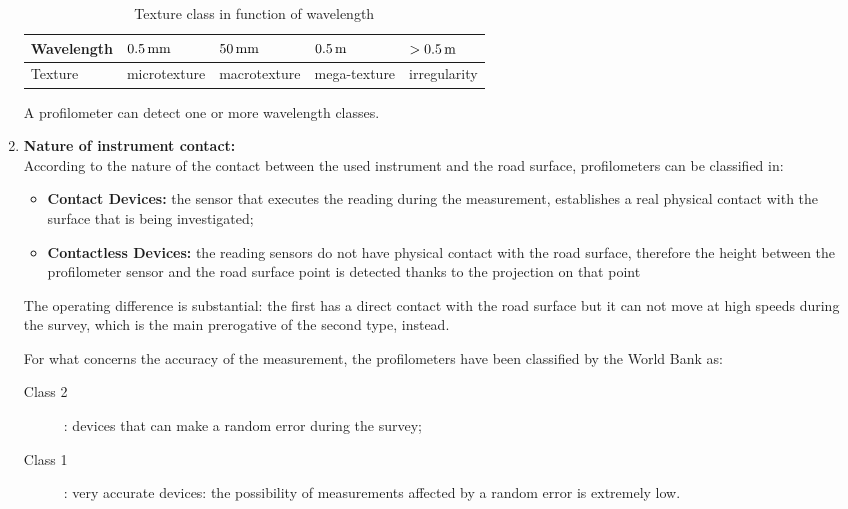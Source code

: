 \documentclass[tesi]{subfiles}
\begin{document}
\begin{enumerate}
\begin{table}[ht]
\centering
    \begin{tabular}{ | l | l | l | l | l |}

    \hline
    Wavelength & \quad $\num{0.5} \thinspace \si{\milli\meter}$ & \quad $\num{50} \thinspace \si{\milli\meter}$ & \quad $\num{0.5}\thinspace \si{\meter}$ & $ > \num{0.5} \thinspace \si{\meter} $  \\ \hline
   \quad  Texture & microtexture& macrotexture &mega-texture &	irregularity \\

\hline
    \end{tabular}
 \caption{Texture class in function of wavelength}
\end{table}
A profilometer can detect one or more wavelength classes.
\clearpage
\item \textbf{Nature of instrument contact:}\label{ssc:Instrument_Contact}\leavevmode\\
According to the nature of the contact between the used instrument and the road surface, profilometers can be classified in:
\begin{itemize}
\item \textbf{Contact Devices:} the sensor that executes the reading during the measurement, establishes a real physical contact with the surface that is being investigated;

\item \textbf{Contactless Devices:} the reading sensors do not have physical contact with the road surface, therefore the height between the profilometer sensor and the road surface point is detected thanks to the projection on that point
\end{itemize}
The operating difference is substantial: the first has a direct contact with the road surface but it can not move at high speeds during the survey, which is the main prerogative of the second type, instead. 

For what concerns the accuracy of the measurement, the profilometers have been classified by the World Bank\cite{sayers1995calculation} as:
\begin{description}

	\item [Class 2]: devices that can make a random error during the survey;
	\item [Class 1]: very accurate devices: the possibility of measurements affected by a random error is extremely low.

\end{description}


\end{enumerate}
\end{document}
